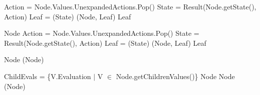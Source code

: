 \begin{algorithm}[H]
    \begin{algorithmic}[1]
                \State Action = Node.Values.UnexpandedActions.Pop()
                \State State = Result(Node.getState(), Action)
                \State Leaf = (State)
                \State {}(Node, Leaf) 
            \EndWhile
            \State \Return Leaf
        \EndProcedure
    \end{algorithmic}    
\end{algorithm}

\begin{algorithm}[H]
    \begin{algorithmic}[1]
                \State \Return Node
            \EndIf
            \State Action = Node.Values.UnexpandedActions.Pop()
            \State State = Result(Node.getState(), Action)
            \State Leaf = (State)
            \State {}(Node, Leaf) 
            \State \Return Leaf
        \EndProcedure
    \end{algorithmic}    
\end{algorithm}


\begin{algorithm}[H]
    \begin{algorithmic}[1]
                \State \Return Node
            \EndIf
            \State \Return {}(Node)
        \EndProcedure
    \end{algorithmic}    
\end{algorithm}

\begin{algorithm}[H]
    \begin{algorithmic}[1]
        \State ChildEvals = \{V.Evaluation $|$ V $\in$ Node.getChildrenValues()\}
            \State \Return Node
            \State \Return Node
        \EndIf
        \State \Return {}(Node)
    \EndProcedure
    \end{algorithmic}    
\end{algorithm}

